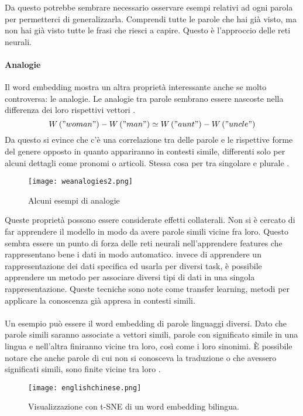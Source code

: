 Da questo potrebbe sembrare necessario osservare esempi relativi ad ogni parola per permetterci di generalizzarla. Comprendi tutte le parole che hai già visto, ma non hai già visto tutte le frasi che riesci a capire. Questo è l’approccio delle reti neurali.

\paragraph{Analogie}Il word embedding mostra un altra proprietà interessante anche se molto controversa: le analogie. Le analogie tra parole sembrano essere nascoste nella differenza dei loro rispettivi vettori \cite{Mikolov13}. 
\begin{equation}
  W\left ( "woman" \right ) -  W\left ( "man" \right ) \simeq W\left ( "aunt" \right ) -  W\left ( "uncle" \right )
\end{equation}
Da questo si evince che c’è una correlazione tra delle parole e le rispettive forme del genere opposto in quanto appariranno in contesti simile, differenti solo per alcuni dettagli come pronomi o articoli. Stessa cosa per tra singolare e plurale \cite{Mikolov13}.
\begin{figure}[htb]
	\centering
	\texttt{[image: weanalogies2.png]}
	\caption{Alcuni esempi di analogie}
	\label{analogies}
\end{figure}
Queste proprietà possono essere considerate effetti collaterali. Non si è cercato di far apprendere il modello in modo da avere parole simili vicine fra loro. Questo sembra essere un punto di forza delle reti neurali nell’apprendere features che rappresentano bene i dati in modo automatico. invece di apprendere un rappresentazione dei dati specifica ed usarla per diversi task, è possibile apprendere un metodo per associare diversi tipi di dati in una singola rappresentazione. Queste tecniche sono note come transfer learning, metodi per applicare la conoscenza già appresa in contesti simili.
\\\\
Un esempio può essere il word embedding di parole linguaggi diversi. Dato che parole simili saranno associate a vettori simili, parole con significato simile in una lingua e nell’altra finiranno vicine tra loro, così come i loro sinonimi. È possibile notare che anche parole di cui non si conosceva la traduzione o che avessero significati simili, sono finite vicine tra loro \cite{Zou13}.
\begin{figure}[htb]
	\centering
	\texttt{[image: englishchinese.png]}
	\caption{Visualizzazione con t-SNE di un word embedding bilingua. }
	\label{englishchinese}
\end{figure}

